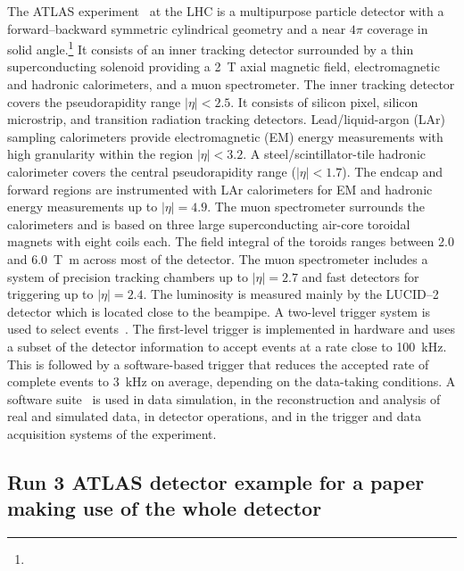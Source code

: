 The ATLAS experiment~\cite{PERF-2007-01,GENR-2019-02} at the LHC is a multipurpose particle detector
with a forward--backward symmetric cylindrical geometry and a near \(4\pi\) coverage in 
solid angle.\footnote{\AtlasCoordFootnote}
It consists of an inner tracking detector surrounded by a thin superconducting solenoid
providing a \qty{2}{\tesla} axial magnetic field, electromagnetic and hadronic calorimeters, and a muon spectrometer.
The inner tracking detector covers the pseudorapidity range \(|\eta| < 2.5\).
It consists of silicon pixel, silicon microstrip, and transition radiation tracking detectors.
Lead/liquid-argon (LAr) sampling calorimeters provide electromagnetic (EM) energy measurements
with high granularity within the region \(|\eta|< 3.2\).
A steel/scintillator-tile hadronic calorimeter covers the central pseudorapidity range (\(|\eta| < 1.7\)).
The endcap and forward regions are instrumented with LAr calorimeters
for EM and hadronic energy measurements up to \(|\eta| = 4.9\).
The muon spectrometer surrounds the calorimeters and is based on
three large superconducting air-core toroidal magnets with eight coils each.
The field integral of the toroids ranges between \num{2.0} and \qty{6.0}{\tesla\metre}
across most of the detector. 
The muon spectrometer includes a system of precision tracking chambers up to \(|\eta| = 2.7\) and fast detectors for triggering up to \(|\eta| = 2.4\).
The luminosity is measured mainly by the LUCID--2 detector which is located close to the beampipe.
A two-level trigger system is used to select events~\cite{TRIG-2022-01}. 
The first-level trigger is implemented in hardware and uses a subset of the detector information
to accept events at a rate close to \qty{100}{\kHz}.
This is followed by a software-based trigger that
reduces the accepted rate of complete events to \qty{3}{\kHz} on average,
depending on the data-taking conditions.
A software suite~\cite{SOFT-2022-02} is used in data simulation, in the reconstruction
and analysis of real and simulated data, in detector operations, and in the trigger and data acquisition
systems of the experiment.

\subsection{Run 3 ATLAS detector example for a paper making use of the whole detector}
\label{sec:atlas3b}

